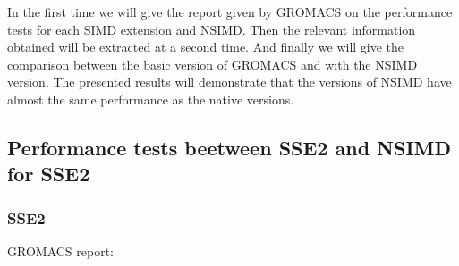 In the first time we will give the report given by GROMACS on the performance tests for each SIMD extension and NSIMD. Then the relevant information obtained will be extracted at a second time. And finally we will give the comparison between the basic version of GROMACS and with the NSIMD version. The presented results will demonstrate  that the versions of NSIMD have almost the same performance as the native versions.
 
\subsection{Performance tests beetween SSE2 and NSIMD for SSE2}
\subsubsection{SSE2}
GROMACS report: \\
